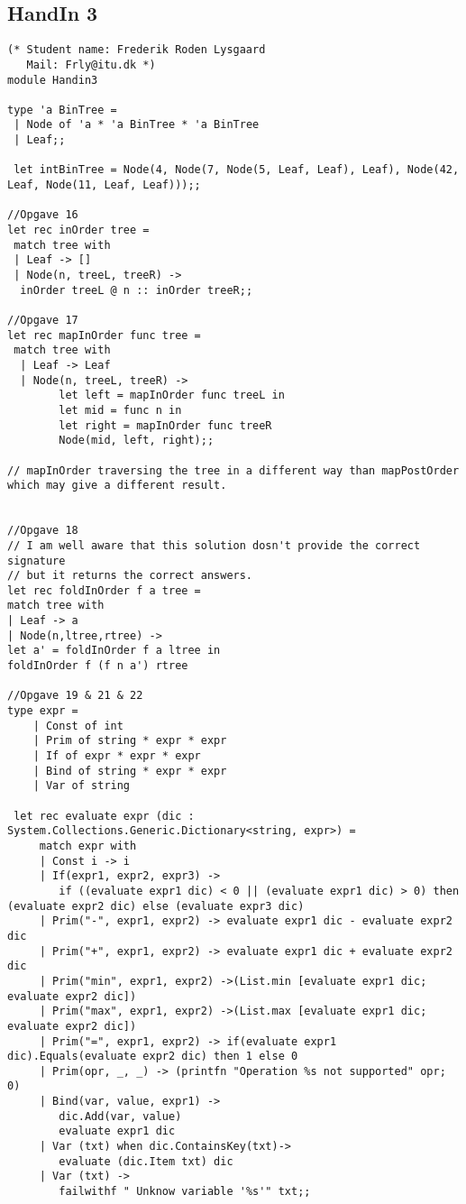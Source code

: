 \subsection{HandIn 3}
\label{Appendix_FSharp_Frederik_3}
\begin{lstlisting}
(* Student name: Frederik Roden Lysgaard
   Mail: Frly@itu.dk *)
module Handin3

type 'a BinTree = 
 | Node of 'a * 'a BinTree * 'a BinTree
 | Leaf;;

 let intBinTree = Node(4, Node(7, Node(5, Leaf, Leaf), Leaf), Node(42, Leaf, Node(11, Leaf, Leaf)));; 

//Opgave 16
let rec inOrder tree =
 match tree with
 | Leaf -> []
 | Node(n, treeL, treeR) ->
  inOrder treeL @ n :: inOrder treeR;;

//Opgave 17
let rec mapInOrder func tree = 
 match tree with
  | Leaf -> Leaf
  | Node(n, treeL, treeR) ->
        let left = mapInOrder func treeL in
        let mid = func n in
        let right = mapInOrder func treeR
        Node(mid, left, right);;

// mapInOrder traversing the tree in a different way than mapPostOrder which may give a different result. 


//Opgave 18
// I am well aware that this solution dosn't provide the correct signature
// but it returns the correct answers.
let rec foldInOrder f a tree =
match tree with
| Leaf -> a
| Node(n,ltree,rtree) -> 
let a' = foldInOrder f a ltree in
foldInOrder f (f n a') rtree

//Opgave 19 & 21 & 22
type expr =
    | Const of int
    | Prim of string * expr * expr
    | If of expr * expr * expr
    | Bind of string * expr * expr
    | Var of string
 
 let rec evaluate expr (dic : System.Collections.Generic.Dictionary<string, expr>) =
     match expr with
     | Const i -> i
     | If(expr1, expr2, expr3) ->
        if ((evaluate expr1 dic) < 0 || (evaluate expr1 dic) > 0) then (evaluate expr2 dic) else (evaluate expr3 dic)
     | Prim("-", expr1, expr2) -> evaluate expr1 dic - evaluate expr2 dic
     | Prim("+", expr1, expr2) -> evaluate expr1 dic + evaluate expr2 dic
     | Prim("min", expr1, expr2) ->(List.min [evaluate expr1 dic; evaluate expr2 dic])
     | Prim("max", expr1, expr2) ->(List.max [evaluate expr1 dic; evaluate expr2 dic])
     | Prim("=", expr1, expr2) -> if(evaluate expr1 dic).Equals(evaluate expr2 dic) then 1 else 0
     | Prim(opr, _, _) -> (printfn "Operation %s not supported" opr; 0)
     | Bind(var, value, expr1) ->
        dic.Add(var, value)
        evaluate expr1 dic
     | Var (txt) when dic.ContainsKey(txt)->
        evaluate (dic.Item txt) dic
     | Var (txt) ->
        failwithf " Unknow variable '%s'" txt;;


\end{lstlisting}
